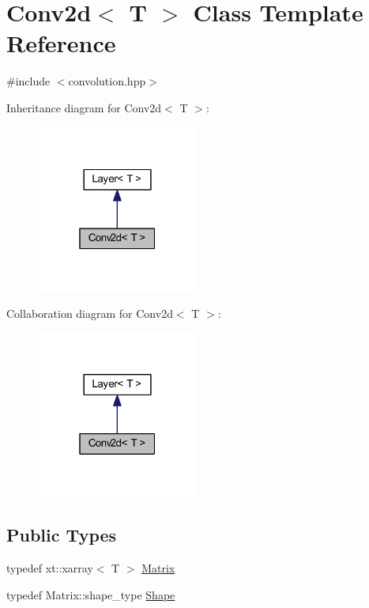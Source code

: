 \hypertarget{class_conv2d}{}\section{Conv2d$<$ T $>$ Class Template Reference}
\label{class_conv2d}


{\ttfamily \#include $<$convolution.\+hpp$>$}



Inheritance diagram for Conv2d$<$ T $>$\+:\nopagebreak
\begin{figure}[H]
\begin{center}
\leavevmode
\includegraphics[width=151pt]{class_conv2d__inherit__graph}
\end{center}
\end{figure}


Collaboration diagram for Conv2d$<$ T $>$\+:\nopagebreak
\begin{figure}[H]
\begin{center}
\leavevmode
\includegraphics[width=151pt]{class_conv2d__coll__graph}
\end{center}
\end{figure}
\subsection*{Public Types}
\begin{DoxyCompactItemize}
\item 
typedef xt\+::xarray$<$ T $>$ \mbox{\hyperlink{class_conv2d_a8263e2f2c46243e39fbca5712603c0fd}{Matrix}}
\item 
typedef Matrix\+::shape\+\_\+type \mbox{\hyperlink{class_conv2d_a78480f9c798b598a0bda9eadb1731225}{Shape}}
\end{DoxyCompactItemize}
